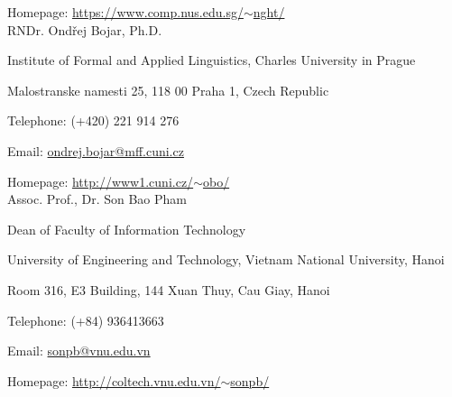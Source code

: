 \documentclass[9pt]{extreport}
\begin{document}
Homepage: \href{https://www.comp.nus.edu.sg/$\sim$nght/}{https://www.comp.nus.edu.sg/$\sim$nght/} \\
%

RNDr. Ond\v{r}ej Bojar, Ph.D.

Institute of Formal and Applied Linguistics, Charles University in Prague

Malostranske namesti 25, 118 00 Praha 1, Czech Republic

Telephone: (+420) 221 914 276

Email: \href{mailto:ondrej.bojar@mff.cuni.cz}{ondrej.bojar@mff.cuni.cz}

Homepage: \href{http://www1.cuni.cz/~obo/}{http://www1.cuni.cz/$\sim$obo/} \\
%

Assoc. Prof., Dr. Son Bao Pham 

Dean of Faculty of Information Technology

University of Engineering and Technology, Vietnam National University, Hanoi

Room 316, E3 Building, 144 Xuan Thuy, Cau Giay, Hanoi

Telephone: (+84) 936413663

Email: \href{mailto:sonpb@vnu.edu.vn}{sonpb@vnu.edu.vn}

Homepage: \href{http://coltech.vnu.edu.vn/\~sonpb/}{http://coltech.vnu.edu.vn/$\sim$sonpb/} \\ 

\bigskip




\end{document}
